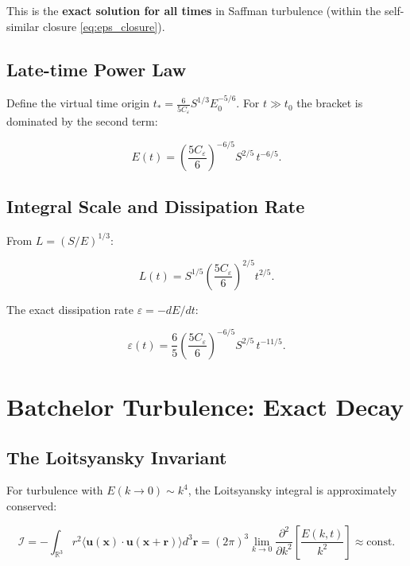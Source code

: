 \documentclass[12pt,a4paper]{article}
\newcommand{\eps}{\varepsilon}
\newcommand{\Ceps}{C_{\varepsilon}}
\newcommand{\Loits}{\mathcal{I}}
\theoremstyle{plain}
\theoremstyle{definition}
\begin{document}
This is the \textbf{exact solution for all times} in Saffman turbulence
(within the self-similar closure \cref{eq:eps_closure}).

\subsection{Late-time Power Law}

Define the virtual time origin $t_* = \tfrac{6}{5\Ceps} S^{1/3} E_0^{-5/6}$.
For $t \gg t_0$ the bracket is dominated by the second term:

\begin{equation}
  \boxed{E(t) = \left(\frac{5\Ceps}{6}\right)^{-6/5} S^{2/5}\,t^{-6/5}.}
  \label{eq:saffman_power}
\end{equation}

\subsection{Integral Scale and Dissipation Rate}

From $L = (S/E)^{1/3}$:

\begin{equation}
  \boxed{L(t) = S^{1/5}\left(\frac{5\Ceps}{6}\right)^{2/5} t^{2/5}.}
  \label{eq:saffman_L}
\end{equation}

The exact dissipation rate $\eps = -dE/dt$:

\begin{equation}
  \boxed{
  \eps(t) = \frac{6}{5}\left(\frac{5\Ceps}{6}\right)^{-6/5} S^{2/5}\,t^{-11/5}.
  }
  \label{eq:saffman_eps}
\end{equation}

\section{Batchelor Turbulence: Exact Decay}
\label{sec:batchelor}

\subsection{The Loitsyansky Invariant}

For turbulence with $E(k\to 0)\sim k^4$, the Loitsyansky integral
is approximately conserved:

\begin{equation}
  \Loits = -\int_{\mathbb{R}^3} r^2
             \langle \bm{u}(\bm{x})\cdot\bm{u}(\bm{x}+\bm{r})\rangle
             d^3\bm{r}
           = (2\pi)^3 \lim_{k\to 0}
             \frac{\partial^2}{\partial k^2}\!\left[\frac{E(k,t)}{k^2}\right]
           \approx \mathrm{const}.
  \label{eq:loitsyansky}
\end{equation}
\end{document}
